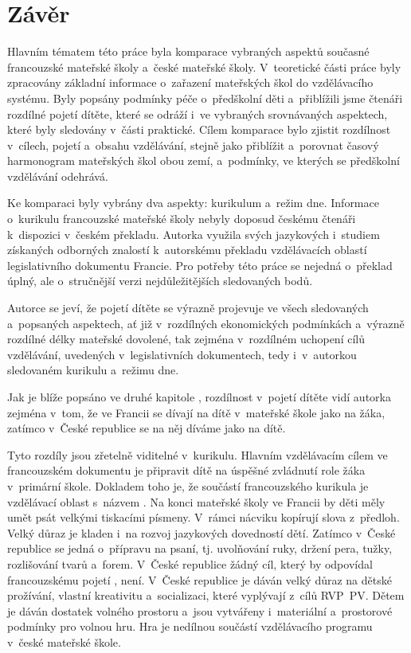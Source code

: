 \chapter*{Závěr}
Hlavním tématem této práce byla komparace vybraných aspektů současné francouzské mateřské školy a~české mateřské školy. V~teoretické části práce byly zpracovány základní informace o~zařazení mateřských škol do vzdělávacího systému. Byly popsány podmínky péče o~předškolní děti a~přiblížili jsme čtenáři rozdílné pojetí dítěte, které se odráží i~ve vybraných srovnávaných aspektech, které byly sledovány v~části praktické. Cílem komparace bylo zjistit rozdílnost v~cílech, pojetí a~obsahu vzdělávání, stejně jako přiblížit a~porovnat časový harmonogram mateřských škol obou zemí, a~podmínky, ve kterých se předškolní vzdělávání odehrává.  

Ke komparaci byly vybrány dva aspekty: kurikulum a~režim dne. Informace o~kurikulu francouzské mateřské školy nebyly doposud českému čtenáři k~dispozici v~českém překladu. Autorka využila svých jazykových i~studiem získaných odborných znalostí k~autorskému překladu vzdělávacích oblastí legislativního dokumentu Francie. Pro potřeby této práce se nejedná o~překlad úplný, ale o~stručnější verzi nejdůležitějších sledovaných bodů. 

Autorce se jeví, že pojetí dítěte se výrazně projevuje ve všech sledovaných a~popsaných aspektech, ať již v~rozdílných ekonomických podmínkách a~výrazně rozdílné délky mateřské dovolené, tak zejména v~rozdílném uchopení cílů vzdělávání, uvedených v~legislativních dokumentech, tedy i~v~autorkou sledovaném kurikulu a~režimu dne. 

Jak je blíže popsáno ve druhé kapitole , rozdílnost v~pojetí dítěte vidí autorka zejména v~tom, že ve Francii se dívají na dítě v~mateřské škole jako na žáka, zatímco v~České republice se na něj díváme jako na dítě.   

Tyto rozdíly jsou zřetelně viditelné v~kurikulu. Hlavním vzdělávacím cílem ve francouzském dokumentu je připravit dítě na úspěšné zvládnutí role žáka v~primární škole. Dokladem toho je, že součástí francouzského kurikula je vzdělávací oblast s~názvem . Na konci mateřské školy ve Francii by děti měly umět psát velkými tiskacími písmeny. V~rámci nácviku kopírují slova z~předloh. Velký důraz je kladen i~na rozvoj jazykových dovedností dětí. Zatímco v~České republice se jedná o~přípravu na psaní, tj. uvolňování ruky, držení pera, tužky, rozlišování tvarů a~forem. V~České republice žádný cíl, který by odpovídal francouzskému pojetí , není. V~České republice je dáván velký důraz na dětské prožívání, vlastní kreativitu a~socializaci, které vyplývají z~cílů RVP~PV. Dětem je dáván dostatek volného prostoru a~jsou vytvářeny i~materiální a~prostorové podmínky pro volnou hru. Hra je nedílnou součástí vzdělávacího programu v~české mateřské škole. 

